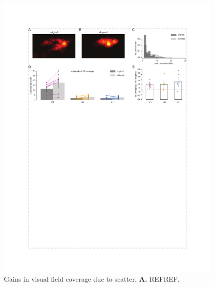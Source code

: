 \begin{figure}[t!]
    \includegraphics[width=\textwidth]{figures/chapter_3/fig_3-5_vf_coverage/fig_3-5_vf_coverage.pdf}
    \vspace{.1in}
    \caption[Compensatory visual field coverage]{Gains in visual field coverage due to scatter. 
    \textbf{A.} REFREF.
    \label{fig:vf_coverage}}
\end{figure}


